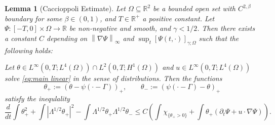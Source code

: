 \documentclass[11pt]{amsart}
\newtheorem{lemma}[theorem]{Lemma}
\theoremstyle{remark}
\theoremstyle{definition}
\newcommand{\R}{\mathbb{R}}
\newcommand{\norm}[1]{\left\lVert#1\right\rVert}
\newcommand{\paren}[1]{\left( #1 \right)}
\newcommand{\bracket}[1]{\left[ #1 \right]}
\newcommand{\abs}[1]{\left\lvert #1 \right\rvert}
\newcommand{\del}{\partial}
\newcommand{\grad}{\nabla}
\newcommand{\ddt}{\frac{d}{dt}}
\newcommand{\indic}[1]{\chi_{\{#1\}}}
\begin{document}
\begin{lemma}[Caccioppoli Estimate] \label{thm:caccioppoli}
Let $\Omega \subseteq \R^2$ be a bounded open set with $C^{2,\beta}$ boundary for some $\beta \in (0,1)$, and $T \in \R^+$ a positive constant.  Let $\Psi: [-T,0]\times \Omega \to \R$ be non-negative and smooth, and $\gamma < 1/2$.  Then there exists a constant $C$ depending on $\norm{\grad \Psi}_\infty$ and $\sup_t \bracket{\Psi(t,\cdot)}_{\gamma; \Omega}$ such that the following holds:
\vskip0.3cm

Let $\theta \in L^\infty(0,T; L^4(\Omega)) \cap L^2(0,T;H^1(\Omega))$ and $u \in L^\infty(0,T; L^4(\Omega))$ solve \eqref{eq:main linear} in the sense of distributions.  Then the functions
\[ \theta_+ := \paren{\theta - \psi(\cdot-\Gamma)}_+, \qquad \theta_- := \paren{\psi(\cdot-\Gamma) - \theta}_+ \]
satisfy the inequlality
\[ \ddt \int \theta_+^2 + \int \abs{\Lambda^{1/2} \theta_+}^2 - \int \Lambda^{1/2} \theta_+ \Lambda^{1/2} \theta_- \leq C \paren{ \int \indic{\theta_+ > 0} + \int \theta_+ (\del_t \Psi + u\cdot\grad\Psi) }. \]


\end{lemma}
\end{document}
